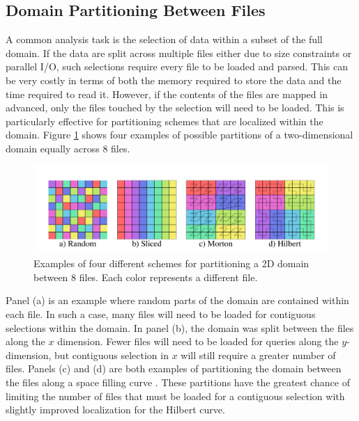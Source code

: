 \documentclass[apjl]{emulateapj}
\begin{document}
\subsection{Domain Partitioning Between Files}\label{SS:decomp}
A common analysis task is the selection of data within a subset of the full domain. If the data are split across multiple files either due to size constraints or parallel I/O, such selections require every file to be loaded and parsed. This can be very costly in terms of both the memory required to store the data and the time required to read it. However, if the contents of the files are mapped in advanced, only the files touched by the selection will need to be loaded. This is particularly effective for partitioning schemes that are localized within the domain. Figure \ref{fig:files} shows four examples of possible partitions of a two-dimensional domain equally across 8 files. 
%
\begin{figure}[htbp]
\begin{center}
\includegraphics[width=\columnwidth,keepaspectratio]{../images/files.png}
\caption{Examples of four different schemes for partitioning a 2D domain between 8 files. Each color represents a different file.}
\label{fig:files}
\end{center}
\end{figure}
%

Panel (a) is an example where random parts of the domain are contained within each file. In such a case, many files will need to be loaded for contiguous selections within the domain. In panel (b), the domain was split between the files along the $x$ dimension. Fewer files will need to be loaded for queries along the $y$-dimension, but contiguous selection in $x$ will still require a greater number of files. Panels (c) and (d) are both examples of partitioning the domain between the files along a space filling curve \citep[Morton and Hilbert curves respectively,][]{Morton1996,Hilbert1970}. These partitions have the greatest chance of limiting the number of files that must be loaded for a contiguous selection with slightly improved localization for the Hilbert curve.
\end{document}
